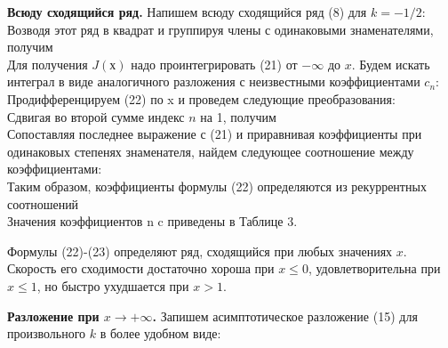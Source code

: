 \textbf{Всюду сходящийся ряд.} Напишем всюду сходящийся ряд (8) для $k = -1/2$:
\begin{equation}
\label{eq:ref_2_6_4}
\end{equation}
Возводя этот ряд в квадрат и группируя члены с одинаковыми знаменателями, получим
\begin{equation}
\label{eq:ref_2_6_5}
\end{equation}
Для получения $J(х)$ надо проинтегрировать (21) от $-\infty$ до $x$. Будем искать
интеграл в виде аналогичного разложения с неизвестными коэффициентами $c_n$:
\begin{equation}
\label{eq:ref_2_6_6}
\end{equation}
Продифференцируем (22) по x и проведем следующие преобразования:
\begin{equation}
\label{eq:ref_2_6_7}
\end{equation}
Сдвигая во второй сумме индекс $n$ на 1, получим
\begin{equation}
\label{eq:ref_2_6_8}
\end{equation}
Сопоставляя последнее выражение с (21) и приравнивая коэффициенты при
одинаковых степенях знаменателя, найдем следующее соотношение между
коэффициентами:
\begin{equation}
\label{eq:ref_2_6_9}
\end{equation}
Таким образом, коэффициенты формулы (22) определяются из рекуррентных соотношений
\begin{equation}
\label{eq:ref_2_6_10}
\end{equation}
Значения коэффициентов n c приведены в Таблице 3.

Формулы (22)-(23) определяют ряд, сходящийся при любых значениях $x$.
Скорость его сходимости достаточно хороша при $x \leqslant 0$, удовлетворительна при
$x \leqslant 1$, но быстро ухудшается при $x > 1$.

\textbf{Разложение при $x \to +\infty$.} Запишем асимптотическое разложение (15) для
произвольного $k$ в более удобном виде:

